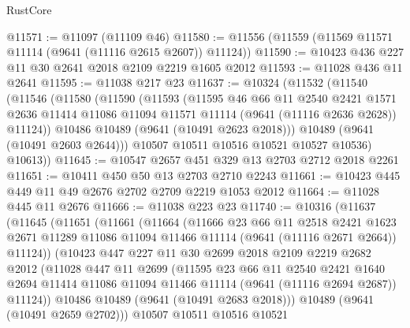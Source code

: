 \begin{lexlean}{RustCore}
\begin{coremodule}
@11571 := @11097 (@11109 @46)
@11580 := @11556 (@11559 (@11569 @11571 @11114 (@9641 (@11116 @2615 @2607)) @11124))
@11590 := @10423 @436 @227 @11 @30 @2641 @2018 @2109 @2219 @1605 @2012
@11593 := @11028 @436 @11 @2641
@11595 := @11038 @217 @23
@11637 := @10324
    (@11532
      (@11540
        (@11546
          (@11580
            (@11590
              (@11593
                (@11595
                  @46
                  @66
                  @11
                  @2540
                  @2421
                  @1571
                  @2636
                  @11414
                  @11086
                  @11094
                  @11571
                  @11114
                  (@9641 (@11116 @2636 @2628))
                  @11124))
              @10486
              @10489
              (@9641 (@10491 @2623 @2018)))
            @10489
            (@9641 (@10491 @2603 @2644)))
          @10507
          @10511
          @10516
          @10521
          @10527
          @10536)
        @10613))
@11645 := @10547 @2657 @451 @329 @13 @2703 @2712 @2018 @2261
@11651 := @10411 @450 @50 @13 @2703 @2710 @2243
@11661 := @10423 @445 @449 @11 @49 @2676 @2702 @2709 @2219 @1053 @2012
@11664 := @11028 @445 @11 @2676
@11666 := @11038 @223 @23
@11740 := @10316
    (@11637
      (@11645
        (@11651
          (@11661
            (@11664
              (@11666
                @23
                @66
                @11
                @2518
                @2421
                @1623
                @2671
                @11289
                @11086
                @11094
                @11466
                @11114
                (@9641 (@11116 @2671 @2664))
                @11124))
            (@10423
              @447
              @227
              @11
              @30
              @2699
              @2018
              @2109
              @2219
              @2682
              @2012
              (@11028
                @447
                @11
                @2699
                (@11595
                  @23
                  @66
                  @11
                  @2540
                  @2421
                  @1640
                  @2694
                  @11414
                  @11086
                  @11094
                  @11466
                  @11114
                  (@9641 (@11116 @2694 @2687))
                  @11124))
              @10486
              @10489
              (@9641 (@10491 @2683 @2018)))
            @10489
            (@9641 (@10491 @2659 @2702)))
          @10507
          @10511
          @10516
          @10521

\end{coremodule}
\end{lexlean}
